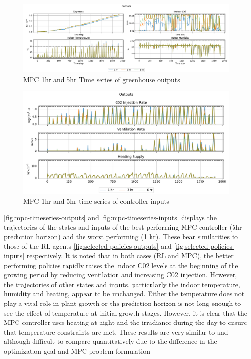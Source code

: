 \begin{figure}[H]
	\centering
	\includegraphics[width=\textwidth]{figures/mpc_outputs_time_series.pdf}
	\caption{MPC 1hr and 5hr Time series of greenhouse outputs}
	\label{fig:mpc-timeseries-outputs}
\end{figure}

\begin{figure}[H]
	\centering
	\includegraphics[width=\textwidth]{figures/mpc_inputs_times_series.pdf}
	\caption{MPC 1hr and 5hr time series of controller inputs}
	\label{fig:mpc-timeseries-inputs}
\end{figure}

\autoref{fig:mpc-timeseries-outputs} and \autoref{fig:mpc-timeseries-inputs} displays the trajectories of the states and inputs of the best performing MPC controller (5hr prediction horizon) and the worst performing (1 hr). These bear similarities to those of the RL agents \autoref{fig:selected-policies-outputs} and \autoref{fig:selected-policies-inputs} respectively. It is noted that in both cases (RL and MPC), the better performing policies rapidly raises the indoor C02 levels at the beginning of the growing period by reducing ventilation and increasing C02 injection. However, the trajectories of other states and inputs, particularly the indoor temperature, humidity and heating, appear to be unchanged. Either the temperature does not play a vital role in plant growth or the prediction horizon is not long enough to see the effect of temperature at initial growth stages. However, it is clear that the MPC controller uses heating at night and the irradiance during the day to ensure that temperature constraints are met. These results are very similar to \cite{morcegoReinforcementLearningModel2023} and \cite{boersmaRobustSamplebasedModel2022} although difficult to compare quantitatively due to the difference in the optimization goal and MPC problem formulation.


